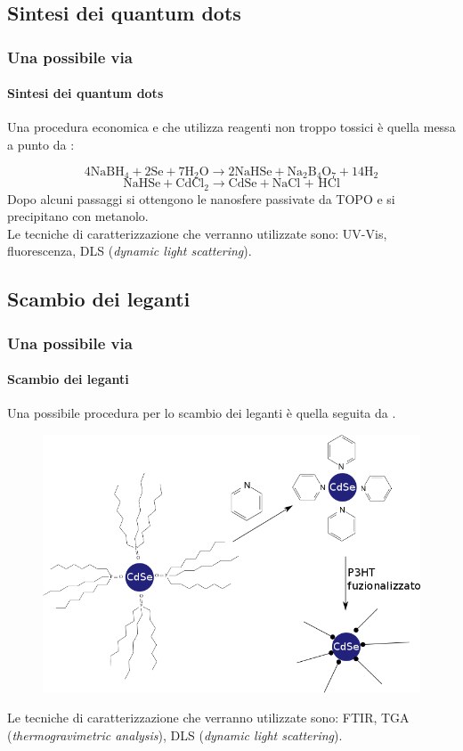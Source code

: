 \documentclass{beamer}
\newcommand{\dr}{\textrm}
\begin{document}
  \subsection{Sintesi dei quantum dots}
    \begin{frame}
      \frametitle{Una possibile via}\framesubtitle{Sintesi dei quantum dots}
      Una procedura economica e che utilizza reagenti non troppo tossici è quella messa a punto da \citet{qd-CdSe-CdCl2}:

 $$ 4\dr{NaBH}_4 + 2\dr{Se} + 7\dr{H}_2\dr{O} \longrightarrow 2\dr{NaHSe} + \dr{Na}_2\dr{B}_4\dr{O}_7 + 14\dr{H}_2 $$
    $$\dr{NaHSe} + \dr{CdCl}_2 \longrightarrow \dr{CdSe} + \dr{NaCl + HCl} $$
    Dopo alcuni passaggi si ottengono le nanosfere passivate da TOPO e si precipitano con metanolo.\\ \vskip 15pt \pause
	Le tecniche di caratterizzazione che verranno utilizzate sono: UV-Vis, fluorescenza, DLS (\emph{dynamic light scattering}).

    \end{frame}


  \subsection{Scambio dei leganti}
    \begin{frame}
      \frametitle{Una possibile via}\framesubtitle{Scambio dei leganti}
      Una possibile procedura per lo scambio dei leganti è quella seguita da \citet{qd-CdSe-caratt}.
      \begin{figure}
	\includegraphics[scale=0.27]{immagini/scambio-leganti.png}
      \end{figure}\pause
      	Le tecniche di caratterizzazione che verranno utilizzate sono: FTIR, TGA (\emph{thermogravimetric analysis}), DLS (\emph{dynamic light scattering}).

    \end{frame}






\tiny{


}

    \begin{frame}


    \end{frame}
\end{document}
